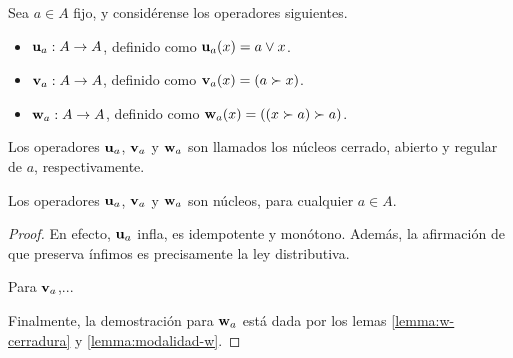 \begin{definition}
Sea $a\in A$ fijo, y considérense los operadores siguientes.
  \begin{itemize}
    \item $\mathbf u_{a}:A\to A$, definido como $\mathbf u_{a}(x)= a\vee x$.
    \item $\mathbf v_{a}:A\to A$, definido como $\mathbf v_{a}(x)=(a\succ
    x)$.
    \item $\mathbf w_{a}:A\to A$, definido como
      $\mathbf w_{a}(x)=((x\succ a)\succ a)$.
  \end{itemize}
  Los operadores $\mathbf u_{a}$, $\mathbf v_{a}$ y $\mathbf w_{a}$ son llamados
  los núcleos cerrado, abierto y regular de $a$, respectivamente.
\end{definition}
\begin{proposition}
  Los operadores $\mathbf u_{a}$, $\mathbf v_{a}$ y $\mathbf w_{a}$ son núcleos, para
  cualquier $a\in A$.
\end{proposition}
\begin{proof}
  En efecto, $\mathbf u_{a}$ infla, es idempotente
  y monótono. Además, la afirmación de que preserva ínfimos es
  precisamente la ley distributiva.

  Para $\mathbf v_{a}$,...

  Finalmente, la demostración para $\mathbf w_{a}$ está
  dada por los lemas \ref{lemma:w-cerradura} y
  \ref{lemma:modalidad-w}.
\end{proof}

